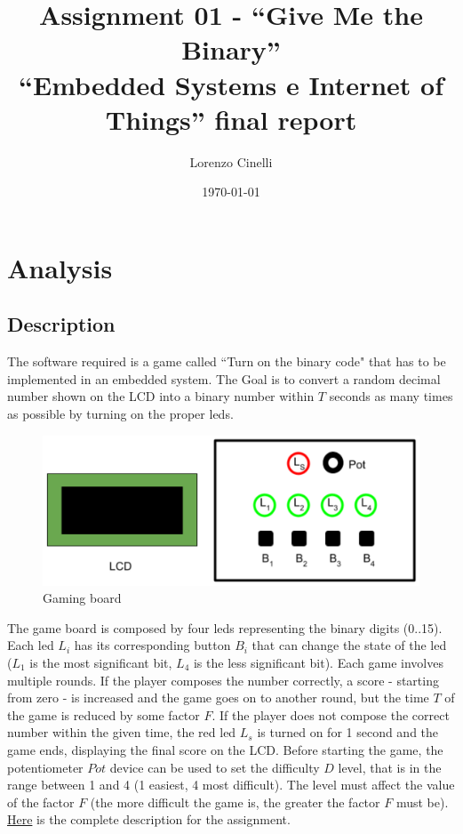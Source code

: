 \documentclass[a4paper,12pt]{report}
\title{Assignment 01 - ``Give Me the Binary''\\
    \large ``Embedded Systems e Internet of Things'' final report}
\author{Lorenzo Cinelli}
\date{\today}
\begin{document}
\maketitle

\tableofcontents

\chapter{Analysis}


    \section{Description}
        The software required is a game called ``Turn on the binary code" that has to be implemented in an embedded system.
        The Goal is to convert a random decimal number shown on the LCD into a binary number within $T$ seconds as many times as possible by turning on the proper leds. 
        \begin{figure}[H]
        	\centering{}
        	\includegraphics[width=\textwidth]{relazione/img/Assignment-01_GMB-Domain.png}
        	\caption{Gaming board}
        	\label{img:board}
        \end{figure}
        The game board is composed by four leds representing the binary digits (0..15). Each led $L_i$ has its corresponding button $B_i$ that can change the state of the led ($L_1$ is the most significant bit, $L_4$ is the less significant bit).
        Each game involves multiple rounds. If the player composes the number correctly, a score - starting from zero - is increased and the game goes on to another round, but the time $T$ of the game is reduced by some factor $F$. If the player does not compose the correct number within the given time, the red led $L_s$ is turned on for 1 second and the game ends, displaying the final score on the LCD.
        \newline
        Before starting the game, the potentiometer $Pot$ device can be used to set the difficulty $D$ level, that is in the range between 1 and 4 (1 easiest, 4 most difficult). The level must affect the value of the factor $F$ (the more difficult the game is, the greater the factor $F$ must be).
        \newline \newline 
        \href{https://docs.google.com/document/d/1eBfmD2Z_LnENrw2ycnXRVqfvKuFERK_plsfLIBfGQ4w/edit?tab=t.0}{Here} is the complete description for the assignment.
    
\end{document}
